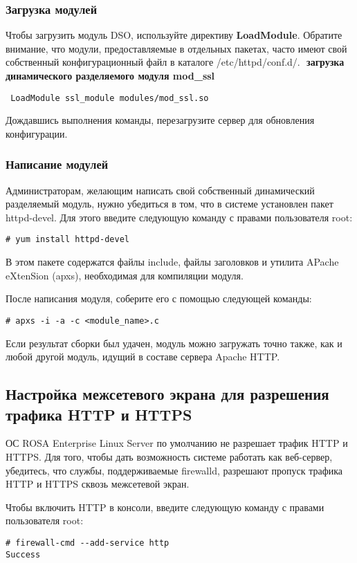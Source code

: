 \documentclass[a4paper,10pt,twoside]{article}
\begin{document}
\subsubsection{Загрузка модулей}
Чтобы загрузить модуль DSO, используйте директиву \textbf{LoadModule}. Обратите внимание, что модули, предоставляемые в отдельных пакетах, часто имеют свой собственный конфигурационный файл в каталоге /etc/httpd/conf.d/.
⁠
\textbf{ загрузка динамического разделяемого модуля mod\_ssl}

\begin{verbatim}
 LoadModule ssl_module modules/mod_ssl.so
\end{verbatim} 

Дождавшись выполнения команды, перезагрузите сервер для обновления конфигурации.


\subsubsection{Написание модулей}
Администраторам, желающим написать свой собственный динамический разделяемый модуль, нужно убедиться в том, что в системе установлен пакет httpd-devel. Для этого введите следующую команду с правами пользователя root: 
\begin{verbatim}
# yum install httpd-devel
\end{verbatim} 
В этом пакете содержатся файлы include, файлы заголовков и утилита APache eXtenSion (apxs), необходимая для компиляции модуля.

После написания модуля, соберите его с помощью следующей команды:
\begin{verbatim}
# apxs -i -a -c <module_name>.c
\end{verbatim} 
Если результат сборки был удачен, модуль можно загружать точно также, как и любой другой модуль, идущий в составе сервера Apache HTTP.
⁠

\subsection{Настройка межсетевого экрана для разрешения трафика HTTP и HTTPS} 
ОС ROSA Enterprise Linux Server по умолчанию не разрешает трафик HTTP и HTTPS. Для того, чтобы дать возможность системе работать как веб-сервер, убедитесь, что службы, поддерживаемые firewalld, разрешают пропуск трафика HTTP и HTTPS сквозь межсетевой экран.

Чтобы включить HTTP в консоли, введите следующую команду с правами пользователя root: 
\begin{verbatim}
# firewall-cmd --add-service http
Success
\end{verbatim} 
\end{document}
